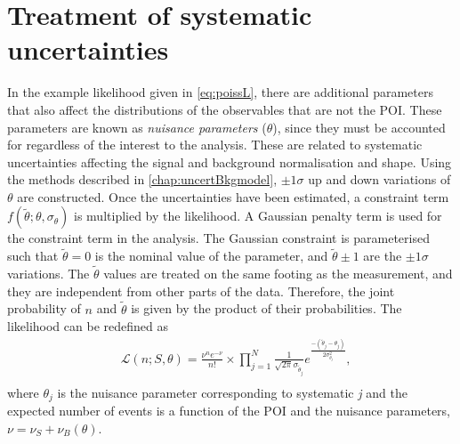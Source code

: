 \section{Treatment of systematic uncertainties}\label{sec:stats:nps}
In the example likelihood given in \cref{eq:poissL}, there are additional parameters that also affect the distributions of the observables that are not the POI. These parameters are known as \emph{nuisance parameters} ($\theta$), since they must be accounted for regardless of the interest to the analysis. These are related to systematic uncertainties affecting the signal and background normalisation and shape. Using the methods described in \cref{chap:uncertBkgmodel}, $\pm 1\sigma$ up and down variations of ${\theta}$ are constructed. Once the uncertainties have been estimated, a constraint term $f(\tilde{\theta};\theta,\sigma_\theta)$ is multiplied by the likelihood. A Gaussian penalty term is used for the constraint term in the analysis. The Gaussian constraint is parameterised such that $\tilde{\theta} = 0$ is the nominal value of the parameter, and $\tilde{\theta} \pm 1$ are the $\pm1\sigma$ variations. The $\tilde{\theta}$ values are treated on the same footing as the measurement, and they are independent from other parts of the data. Therefore, the joint probability of $n$ and $\tilde{\theta}$ is given by the product of their probabilities. The likelihood can be redefined as
\begin{equation}
    \label{eq:likelihood}
    \begin{aligned}
        & \mathcal{L}(n;S,\theta) = \frac{\nu^{n} e^{-\nu}}{n!} \times \prod_{j=1}^{N} \frac{1}{\sqrt{2\pi}\sigma_{\tilde{\theta}_j}} e^\frac{-(\tilde{\theta}_j - \theta_j)}{2\sigma_{\theta_j}^2} , \\
    \end{aligned}
\end{equation}
where $\theta_j$ is the nuisance parameter corresponding to systematic \emph{j} and the expected number of events is a function of the POI and the nuisance parameters, $\nu = \nu_S + \nu_B(\theta)$.

